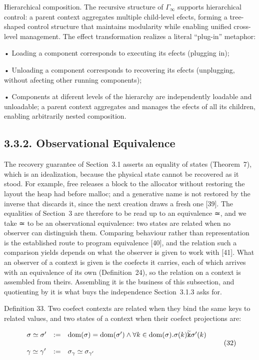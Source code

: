 \documentclass[
  10
]{article}
\begin{document}
Hierarchical composition. The recursive structure of
\(\Gamma _ { \infty }\) supports hierarchical control: a parent context
aggregates multiple child-level efects, forming a tree-shaped control
structure that maintains modularity while enabling unified cross-level
management. The effect transformation realizes a literal ``plug-in''
metaphor:

• Loading a component corresponds to executing its efects (plugging in);

• Unloading a component corresponds to recovering its efects
(unplugging, without afecting other running components);

• Components at diferent levels of the hierarchy are independently
loadable and unloadable; a parent context aggregates and manages the
efects of all its children, enabling arbitrarily nested composition.

\subsection{3.3.2. Observational
Equivalence}\label{observational-equivalence}

The recovery guarantee of Section~3.1 asserts an equality of states
(Theorem~7), which is an idealization, because the physical state cannot
be recovered as it stood. For example, free releases a block to the
allocator without restoring the layout the heap had before malloc; and a
generative name is not restored by the inverse that discards it, since
the next creation draws a fresh one {[}39{]}. The equalities of
Section~3 are therefore to be read up to an equivalence ≃, and we take ≃
to be an observational equivalence: two states are related when no
observer can distinguish them. Comparing behaviour rather than
representation is the established route to program equivalence {[}40{]},
and the relation such a comparison yields depends on what the observer
is given to work with {[}41{]}. What an observer of a context is given
is the coefects it carries, each of which arrives with an equivalence of
its own (Definition~24), so the relation on a context is assembled from
theirs. Assembling it is the business of this subsection, and
quotienting by it is what buys the independence Section~3.1.3 asks for.

Definition 33. Two coefect contexts are related when they bind the same
keys to related values, and two states of a context when their coefect
projections are:

\[
\begin{array} { l l l } { { \sigma \simeq \sigma ^ { \prime } } } & { { : = } } & { { \mathrm { d o m } ( \sigma ) = \mathrm { d o m } ( \sigma ^ { \prime } ) \wedge \forall k \in \mathrm { d o m } ( \sigma ) . \sigma ( k ) \widetilde { \mathtt { k } } \sigma ^ { \prime } ( k ) } } \\ { { } } & { { } } & { { } } \\ { { \gamma \simeq \gamma ^ { \prime } } } & { { : = } } & { { \sigma _ { \gamma } \simeq \sigma _ { \gamma ^ { \prime } } } } \end{array}\tag{32}
\]
\end{document}
